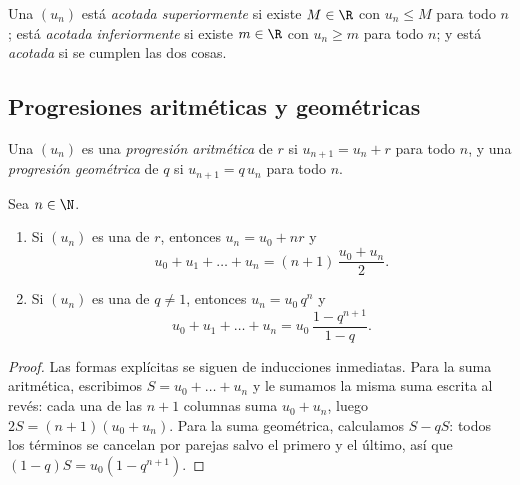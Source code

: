 \begin{definition}\label{def:g12:seq:bounded}
Una  $(u_n)$ está \emph{acotada superiormente}
si existe $M \in \R$ con $u_n \leq M$ para todo $n$; está \emph{acotada
inferiormente} si existe $m \in \R$ con $u_n \geq m$ para todo $n$; y está
\emph{acotada} si se cumplen las dos cosas.
\end{definition}

\subsection{Progresiones aritméticas y geométricas}

\begin{definition}\label{def:g12:seq:arith-geom}
Una  $(u_n)$ es una \emph{progresión
aritmética} de  $r$ si
$u_{n+1} = u_n + r$ para todo $n$, y una \emph{progresión
geométrica} de  $q$ si $u_{n+1} = q\,u_n$
para todo $n$.
\end{definition}

\begin{proposition}\label{prop:g12:seq:arith-geom}
Sea $n \in \N$.
\begin{enumerate}
  \item Si $(u_n)$ es una  de  $r$, entonces
        $u_n = u_0 + nr$ y
        \[
        u_0 + u_1 + \dots + u_n = (n+1)\,\frac{u_0 + u_n}{2}.
        \]
  \item Si $(u_n)$ es una  de  $q \neq 1$,
        entonces $u_n = u_0\, q^n$ y
        \[
        u_0 + u_1 + \dots + u_n = u_0\,\frac{1 - q^{n+1}}{1 - q}.
        \]
\end{enumerate}
\end{proposition}

\begin{proof}
Las formas explícitas se siguen de inducciones inmediatas. Para la suma
aritmética, escribimos $S = u_0 + \dots + u_n$ y le sumamos la misma suma
escrita al revés: cada una de las $n+1$ columnas suma $u_0 + u_n$, luego
$2S = (n+1)(u_0+u_n)$. Para la suma geométrica, calculamos $S - qS$: todos
los términos se cancelan por parejas salvo el primero y el último, así que
$(1-q)S = u_0(1 - q^{n+1})$.
\end{proof}

